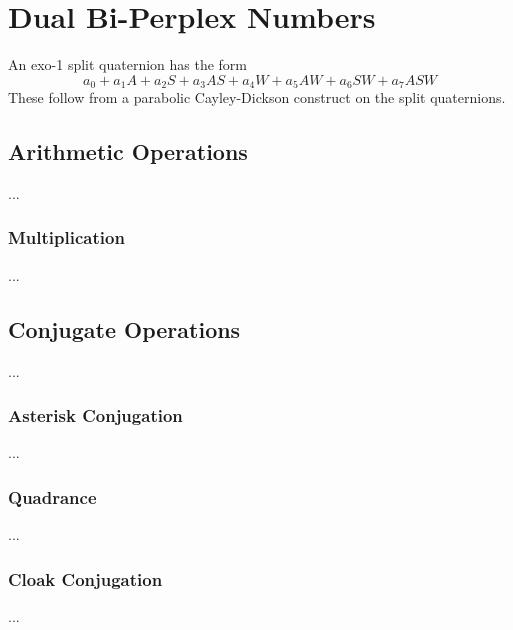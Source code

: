 \chapter{Dual Bi-Perplex Numbers}
An exo-1 split quaternion has the form
\begin{equation}
    a_{0} + a_{1} A + a_{2} S + a_{3} AS + a_{4} W + a_{5} AW + a_{6} SW + a_{7} ASW
\end{equation}
These follow from a parabolic Cayley-Dickson construct on the split quaternions.
\section{Arithmetic Operations}
...
\subsection{Multiplication}
...
\section{Conjugate Operations}
...
\subsection{Asterisk Conjugation}
...
\subsection{Quadrance}
...
\subsection{Cloak Conjugation}
...
